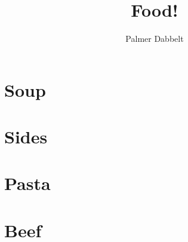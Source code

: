 \documentclass{book}
\author{Palmer Dabbelt}
\title{Food!}
\begin{document}
\maketitle
\tableofcontents
\contentsskip

\newcommand{\maketitle}{}
\renewcommand{\tableofcontents}{}
\newcommand{\author}[1]{}
\newcommand{\title}[1]{}
\renewcommand{\contentsskip}{}
\renewcommand{\bref}[1]{\ref{#1}}

\chapter{Soup}


\chapter{Sides}


\chapter{Pasta}


\chapter{Beef}

\end{document}
